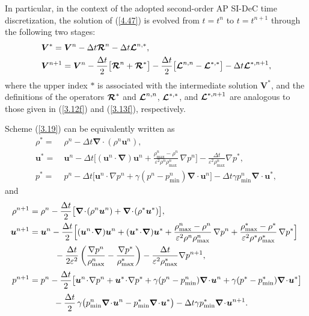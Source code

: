 \documentclass[A4paper,12pt,twoside]{article}
\numberwithin{equation}{section}
\numberwithin{figure}{section}
\numberwithin{table}{section}
\def\bnabla{\bm{\nabla}}
\newcommand{\dt}{\Delta t}
\newcommand{\ve}{\varepsilon}
\newcommand\eref[1]{(\ref{#1})}
\newcommand{\lore}[1]{{\leavevmode\color{red} #1}}
\begin{document}
\lore{In particular, in the context of the adopted second-order AP SI-DeC time discretization,} the solution of \eref{4.47} is evolved from $t=t^n$ to $t=t^{n+1}$ \lore{through} the following two stages:
\begin{equation}
\begin{aligned}
&\bm V^*=\bm V^n-\dt\bm{{\cal R}}^n-\dt\bm{{\cal L}}^{n,*},\\
&\bm V^{n+1}=\bm V^n-\frac{\dt}{2}\big[\bm{{\cal R}}^n+\bm{{\cal R}}^*\big]-\frac{\dt}{2}\big[\bm{{\cal L}}^{n,n}-\bm{{\cal L}}^{*,*}\big]
-\dt\bm{{\cal L}}^{*,n+1},
\end{aligned}
\label{3.19}
\end{equation}
where the upper index $*$ \lore{is associated with} %
the intermediate solution $\bm V^*$, and \lore{the} definitions of the operators
$\bm{{\cal R}}^*$ and $\bm{{\cal L}}^{n,n}$, $\bm{{\cal L}}^{*,*}$, and $\bm{{\cal L}}^{*,n+1}$ are \lore{analogous}
to those given in \eref{3.12f} and \eref{3.13f}, respectively.

\lore{Scheme} \eref{3.19} can be equivalently written as
\begin{equation}
\begin{aligned}
\rho^*=&~\rho^n-\dt\bnabla\!\cdot\!(\rho^n\bm u^n),\\
\bm u^*=&~\bm u^n-\dt\Big[(\bm u^n\!\cdot\!\bnabla)\bm u^n+\frac{\rho_{\max}^n-\rho^n}{\ve^2\rho^n\rho_{\max}^n}\,\nabla p^n\Big]-
\frac{\dt}{\ve^2\rho_{\max}^n}\nabla p^*,\\
p^*=&~p^n-\dt\big[\bm u^n\!\cdot\!\nabla p^n+\gamma(p^n-p_{\min}^n)\bnabla\!\cdot\!\bm u^n\big]-\dt\gamma p_{\min}^n\bnabla\!\cdot\!\bm u^*,
\end{aligned}
\label{3.20}
\end{equation}
and
\begin{equation}
\begin{aligned}
\rho^{n+1}&=\rho^n-\frac{\dt}{2}\big[\bnabla\!\cdot\!(\rho^n\bm u^n)+\bnabla\!\cdot\!(\rho^*\bm u^*)\big],\\
\bm u^{n+1}&=\bm u^n-\frac{\dt}{2}\Big[(\bm u^n\!\cdot\!\bnabla)\bm u^n+(\bm u^*\!\cdot\!\bnabla)\bm u^*
+\frac{\rho_{\max}^n-\rho^n}{\ve^2\rho^n\rho_{\max}^n}\,\nabla p^n+\frac{\rho_{\max}^*-\rho^*}{\ve^2\rho^*\rho_{\max}^*}\,\nabla p^*\Big]\\
&\hspace*{1.05cm}-\frac{\dt}{2\ve^2}\left(\frac{\nabla p^n}{\rho^n_{\max}}-\frac{\nabla p^*}{\rho^*_{\max}}\right)-
\frac{\dt}{\ve^2\rho_{\max}^*}\nabla p^{n+1},\\[0.5ex]
p^{n+1}&=p^n-\frac{\dt}{2}\big[\bm u^n\!\cdot\!\nabla p^n+\bm u^*\!\cdot\!\nabla p^*+\gamma(p^n-p_{\min}^n)\bnabla\!\cdot\!\bm u^n
+\gamma(p^*-p_{\min}^*)\bnabla\!\cdot\!\bm u^*\big]\\[0.5ex]
&\hspace*{1.0cm}-\frac{\dt}{2}\,\gamma\big(p_{\min}^n\bnabla\!\cdot\!\bm u^n-p_{\min}^*\bnabla\!\cdot\!\bm u^*\big)
-\dt\gamma p_{\min}^*\bnabla\!\cdot\!\bm u^{n+1}.
\end{aligned}
\label{3.21}
\end{equation}
\end{document}
